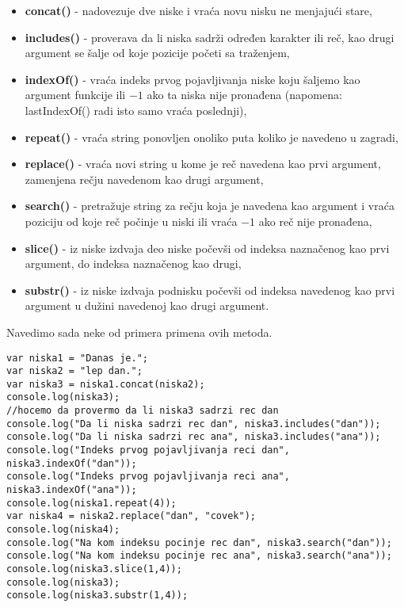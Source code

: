 \begin{itemize}
    \item \textbf{concat()} - nadovezuje dve niske i vraća novu nisku ne menjajući stare,
    \item \textbf{includes()} - proverava da li niska sadrži određen karakter ili reč, kao drugi argument se šalje od koje pozicije početi sa traženjem,  
    \item \textbf{indexOf()} - vraća indeks prvog pojavljivanja niske koju šaljemo kao argument funkcije ili $-1$ ako ta niska nije pronađena (napomena: lastIndexOf() radi isto samo vraća poslednji), 
    \item \textbf{repeat()} - vraća string ponovljen onoliko puta koliko je navedeno u zagradi, 
    \item \textbf{replace()} - vraća novi string u kome je reč navedena kao prvi argument, zamenjena rečju navedenom kao drugi argument, 
    \item \textbf{search()} - pretražuje string za rečju koja je navedena kao argument i vraća poziciju od koje reč počinje u niski ili vraća $-1$ ako reč nije pronađena,  
    \item \textbf{slice()} - iz niske izdvaja deo niske počevši od indeksa naznačenog kao prvi argument, do indeksa naznačenog kao drugi, 
    \item \textbf{substr()} - iz niske izdvaja podnisku počevši od indeksa navedenog kao prvi argument u dužini navedenoj kao drugi argument.
\end{itemize}

Navedimo sada neke od primera primena ovih metoda.
\begin{lstlisting}[backgroundcolor = \color{lightgray}, breaklines=true]
var niska1 = "Danas je.";
var niska2 = "lep dan.";
var niska3 = niska1.concat(niska2);
console.log(niska3);
//hocemo da provermo da li niska3 sadrzi rec dan
console.log("Da li niska sadrzi rec dan", niska3.includes("dan"));
console.log("Da li niska sadrzi rec ana", niska3.includes("ana"));
console.log("Indeks prvog pojavljivanja reci dan", niska3.indexOf("dan"));
console.log("Indeks prvog pojavljivanja reci ana", niska3.indexOf("ana"));
console.log(niska1.repeat(4));
var niska4 = niska2.replace("dan", "covek");
console.log(niska4);
console.log("Na kom indeksu pocinje rec dan", niska3.search("dan"));
console.log("Na kom indeksu pocinje rec ana", niska3.search("ana"));
console.log(niska3.slice(1,4));
console.log(niska3);
console.log(niska3.substr(1,4));    
\end{lstlisting}


